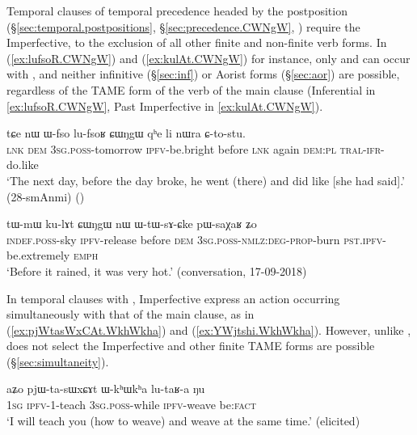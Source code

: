 Temporal clauses of temporal precedence headed by the postposition  (§\ref{sec:temporal.postpositions}, §\ref{sec:precedence.CWNgW}, \citealt[286--287]{jacques14linking}) require the Imperfective, to the exclusion of all other finite and non-finite verb forms. In (\ref{ex:lufsoR.CWNgW}) and (\ref{ex:kulAt.CWNgW}) for instance, only  and  can occur with , and neither infinitive (§\ref{sec:inf}) or Aorist forms (§\ref{sec:aor}) are possible, regardless of the TAME form of the verb of the main clause (Inferential in \ref{ex:lufsoR.CWNgW}, Past Imperfective in \ref{ex:kulAt.CWNgW}).

\begin{exe}
\ex \label{ex:lufsoR.CWNgW}
\gll tɕe nɯ ɯ-fso lu-fsoʁ ɕɯŋgɯ qʰe li nɯra ɕ-to-stu. \\
\textsc{lnk} \textsc{dem} \textsc{3sg}.\textsc{poss}-tomorrow \textsc{ipfv}-be.bright before \textsc{lnk} again \textsc{dem}:\textsc{pl} \textsc{tral}-\textsc{ifr}-do.like \\
\glt `The next day, before the day broke, he went (there) and did like [she had said].' (28-smAnmi)
()
\end{exe}

\begin{exe}
\ex \label{ex:kulAt.CWNgW}
\gll tɯ-mɯ ku-lɤt ɕɯŋgɯ nɯ ɯ-tɯ-sɤ-ɕke pɯ-saχaʁ ʑo \\
\textsc{indef}.\textsc{poss}-sky \textsc{ipfv}-release before \textsc{dem} \textsc{3sg}.\textsc{poss}-\textsc{nmlz}:\textsc{deg}-\textsc{prop}-burn \textsc{pst}.\textsc{ipfv}-be.extremely \textsc{emph} \\
\glt `Before it rained, it was very hot.' (conversation, 17-09-2018)
\end{exe}

In temporal clauses with , Imperfective express an action occurring simultaneously with that of the main clause, as in (\ref{ex:pjWtasWxCAt.WkhWkha}) and (\ref{ex:YWjtshi.WkhWkha}). However, unlike ,  does not select the Imperfective and other finite TAME forms are possible (§\ref{sec:simultaneity}).

\begin{exe}
\ex \label{ex:pjWtasWxCAt.WkhWkha}
\gll aʑo pjɯ-ta-sɯxɕɤt ɯ-kʰɯkʰa lu-taʁ-a ŋu \\
\textsc{1sg} \textsc{ipfv}-1\fl{}-teach \textsc{3sg}.\textsc{poss}-while \textsc{ipfv}-weave be:\textsc{fact} \\
\glt `I will teach you (how to weave) and weave at the same time.' (elicited)
\end{exe}

